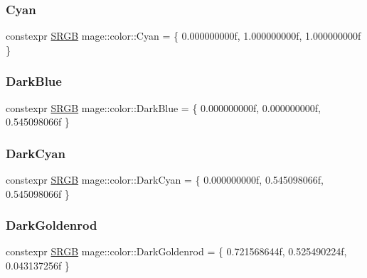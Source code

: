 \subsubsection{\texorpdfstring{Cyan}{Cyan}}
{\footnotesize\ttfamily constexpr \hyperlink{structmage_1_1_s_r_g_b}{S\+R\+GB} mage\+::color\+::\+Cyan = \{ 0.\+000000000f, 1.\+000000000f, 1.\+000000000f \}}

\hypertarget{namespacemage_1_1color_aa375c6defcd2375f1bafe84a3b8e9981}{}\label{namespacemage_1_1color_aa375c6defcd2375f1bafe84a3b8e9981} 
\subsubsection{\texorpdfstring{Dark\+Blue}{DarkBlue}}
{\footnotesize\ttfamily constexpr \hyperlink{structmage_1_1_s_r_g_b}{S\+R\+GB} mage\+::color\+::\+Dark\+Blue = \{ 0.\+000000000f, 0.\+000000000f, 0.\+545098066f \}}

\hypertarget{namespacemage_1_1color_a435926100062e09f81a1a03e4c290bb4}{}\label{namespacemage_1_1color_a435926100062e09f81a1a03e4c290bb4} 
\subsubsection{\texorpdfstring{Dark\+Cyan}{DarkCyan}}
{\footnotesize\ttfamily constexpr \hyperlink{structmage_1_1_s_r_g_b}{S\+R\+GB} mage\+::color\+::\+Dark\+Cyan = \{ 0.\+000000000f, 0.\+545098066f, 0.\+545098066f \}}

\hypertarget{namespacemage_1_1color_a8e21cfca54393867e99fa09989c8bbc1}{}\label{namespacemage_1_1color_a8e21cfca54393867e99fa09989c8bbc1} 
\subsubsection{\texorpdfstring{Dark\+Goldenrod}{DarkGoldenrod}}
{\footnotesize\ttfamily constexpr \hyperlink{structmage_1_1_s_r_g_b}{S\+R\+GB} mage\+::color\+::\+Dark\+Goldenrod = \{ 0.\+721568644f, 0.\+525490224f, 0.\+043137256f \}}

\hypertarget{namespacemage_1_1color_ada693453638824ed651a3c35fd9a9ac5}{}\label{namespacemage_1_1color_ada693453638824ed651a3c35fd9a9ac5} 
